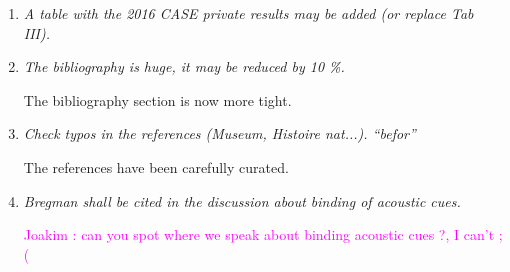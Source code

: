 \documentclass[10pt]{article}
\newcommand{\ja}[1]{\textcolor{magenta}{Joakim : #1}}
\begin{document}
\begin{enumerate}
\item \emph{A table with the 2016 CASE private results may be added (or replace Tab III).}

\item \emph{The bibliography is huge, it may be reduced by 10 \%.}

The bibliography section is now more tight. 

\item \emph{Check typos in the references (Museum, Histoire nat...). “befor”}

The references have been carefully curated.

\item \emph{Bregman shall be cited in the discussion about  binding of acoustic cues.}

\ja{can you spot where we speak about binding acoustic cues ?, I can't ;(}

\end{enumerate}
\end{document}

